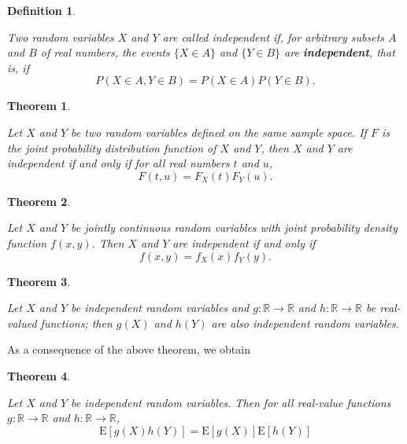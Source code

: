 \documentclass[landscape, 20pt]{extreport}
\newtheorem{theorem}{Theorem}[chapter]
\theoremstyle{definition}
\newtheorem{definition}{Definition}[chapter]
\theoremstyle{definition}
\theoremstyle{definition}
\theoremstyle{definition}
\theoremstyle{remark}
\begin{document}
\begin{definition}
\protect\hypertarget{def:unlabeled-div-21}{}\label{def:unlabeled-div-21}

\emph{Two random variables \(X\) and \(Y\) are called
independent if, for arbitrary subsets \(A\) and \(B\) of real numbers, the
events \(\{X \in A\}\) and \(\{Y \in B\}\) are \textbf{independent}, that is, if
\[P(X \in A, Y \in B) = P(X \in A) P(Y \in B).\]}

\end{definition}

\begin{theorem}
\protect\hypertarget{thm:unlabeled-div-22}{}\label{thm:unlabeled-div-22}

\emph{Let \(X\) and \(Y\) be two random variables defined on the
same sample space. If \(F\) is the joint probability distribution function
of \(X\) and \(Y\), then \(X\) and \(Y\) are independent if and only if for all
real numbers \(t\) and \(u\), \[F(t,u)  = F_X(t) F_Y(u).\]}

\end{theorem}

\begin{theorem}
\protect\hypertarget{thm:unlabeled-div-23}{}\label{thm:unlabeled-div-23}

\emph{Let \(X\) and \(Y\) be jointly continuous random variables
with joint probability density function \(f (x, y)\). Then \(X\) and \(Y\) are
independent if and only if \[f (x, y) = f_X(x) f_Y (y).\]}

\end{theorem}

\begin{theorem}
\protect\hypertarget{thm:unlabeled-div-24}{}\label{thm:unlabeled-div-24}

\emph{Let \(X\) and \(Y\) be independent random variables and
\(g : \mathbb{R} \rightarrow\mathbb{R}\) and
\(h : \mathbb{R} \rightarrow\mathbb{R}\) be real-valued functions; then
\(g(X)\) and \(h(Y )\) are also independent random variables.}

\end{theorem}

As a consequence of the above theorem, we obtain

\begin{theorem}
\protect\hypertarget{thm:unlabeled-div-25}{}\label{thm:unlabeled-div-25}

\emph{Let \(X\) and \(Y\) be independent random variables. Then
for all real-value functions \(g : \mathbb{R} \rightarrow\mathbb{R}\) and
\(h : \mathbb{R} \rightarrow\mathbb{R}\),
\[\mathrm{E}[g(X)h(Y)] = \mathrm{E}[g(X)]\mathrm{E}[h(Y)]\] }

\end{theorem}
\end{document}
